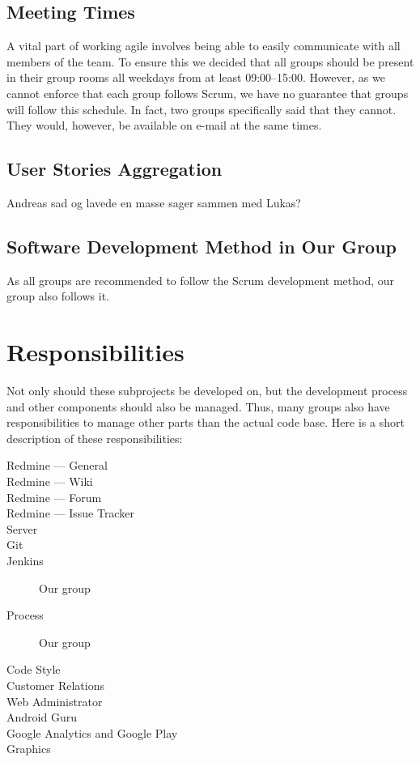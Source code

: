 \subsection{Meeting Times}
A vital part of working agile involves being able to easily communicate with all members of the team. To ensure this we decided that all groups should be present in their group rooms all weekdays from at least 09:00--15:00. However, as we cannot enforce that each group follows Scrum, we have no guarantee that groups will follow this schedule. In fact, two groups specifically said that they cannot. They would, however, be available on e-mail at the same times.

\subsection{User Stories Aggregation}
Andreas sad og lavede en masse sager sammen med Lukas?

\subsection{Software Development Method in Our Group}
As all groups are recommended to follow the Scrum development method, our group also follows it. 

\section{Responsibilities}\label{sec:responsibilities}
Not only should these subprojects be developed on, but the development process and other components should also be managed. Thus, many groups also have responsibilities to manage other parts than the actual code base. Here is a short description of these responsibilities:

\begin{description}
  \item[Redmine --- General] \dummy \dummy
	\item[Redmine --- Wiki] \dummy \dummy
	\item[Redmine --- Forum] \dummy
	\item[Redmine --- Issue Tracker] \dummy \dummy
	\item[Server] \dummy \dummy
	\item[Git] \dummy \dummy
	\item[Jenkins] Our group
	\item[Process] Our group
	\item[Code Style] \dummy \dummy
	\item[Customer Relations] \dummy \dummy
	\item[Web Administrator] \dummy \dummy
	\item[Android Guru] \dummy \dummy
	\item[Google Analytics and Google Play] \dummy \dummy
	\item[Graphics] \dummy \dummy
\end{description}

